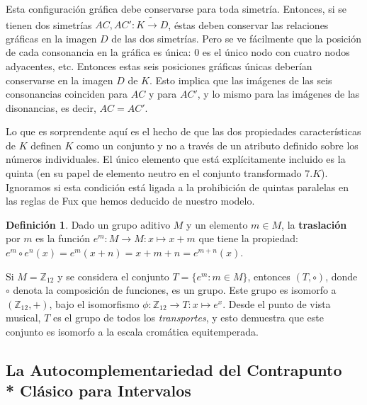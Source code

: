 \documentclass[letterpaper,12pt]{book}
\theoremstyle{definition} \newtheorem{Def}{Definición}[chapter]
\theoremstyle{definition} \newtheorem{Teo}{Teorema}[chapter]
\theoremstyle{definition} \newtheorem{Pro}{Proposición}[chapter]
\theoremstyle{definition} \newtheorem{Lema}{Lema}[chapter]
\begin{document}

Esta configuración gráfica debe conservarse para toda simetría. Entonces, si se tienen dos simetrías $AC, AC':K \tilde{\to} D$, éstas deben conservar las relaciones gráficas en la imagen $D$ de las dos simetrías. Pero se ve fácilmente que la posición de cada consonancia en la gráfica es única: $0$ es el único nodo con cuatro nodos adyacentes, etc. Entonces estas seis posiciones gráficas únicas deberían conservarse en la imagen $D$ de $K$. Esto implica que las imágenes de las seis consonancias coinciden para $AC$ y para $AC'$, y lo mismo para las imágenes de las disonancias, es decir, $AC=AC'$.

Lo que es sorprendente aquí es el hecho de que las dos propiedades características de $K$ definen $K$ como un conjunto y no a través de un atributo definido sobre los números individuales. El único elemento que está explícitamente incluido es la quinta (en su papel de elemento neutro en el conjunto transformado $7.K$). Ignoramos si esta condición está ligada a la prohibición de quintas paralelas en las reglas de Fux que hemos deducido de nuestro modelo. 

\begin{Def}
Dado un grupo aditivo $M$ y un elemento $m \in M$, la \textbf{traslación} por $m$ es la función $e^m:M \to M: x \mapsto x+m$ que tiene la propiedad: $e^m \circ e^n(x)=e^m(x+n)=x+m+n=e^{m+n}(x)$.
\end{Def}

Si $M=\mathbb{Z}_{12}$ y se considera el conjunto $T=\{e^{m}:m \in M\}$, entonces $(T,\circ)$, donde $\circ$ denota la composición de funciones, es un grupo. Este grupo es isomorfo a $(\mathbb{Z}_{12},+)$, bajo el isomorfismo $\phi:\mathbb{Z}_{12} \to T: x \mapsto e^{x}$. Desde el punto de vista musical, $T$ es el grupo de todos los \emph{transportes}, y esto demuestra que este conjunto es isomorfo a la escala cromática equitemperada. 

\subsection[La Autocomplementariedad para Intervalos]{La Autocomplementariedad del Contrapunto \\* Clásico para Intervalos}\label{Intervalos}
\end{document}
